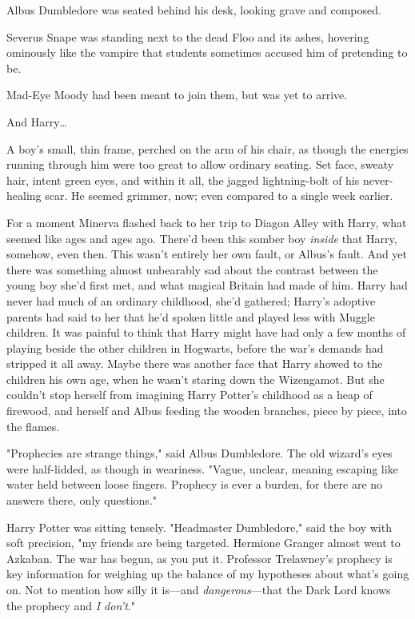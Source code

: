 Albus Dumbledore was seated behind his desk, looking grave and composed.

Severus Snape was standing next to the dead Floo and its ashes, hovering 
ominously like the vampire that students sometimes accused him of pretending to 
be.

Mad-Eye Moody had been meant to join them, but was yet to arrive.

And Harry{\ldots}

A boy's small, thin frame, perched on the arm of his chair, as though the 
energies running through him were too great to allow ordinary seating. Set 
face, sweaty hair, intent green eyes, and within it all, the jagged 
lightning-bolt of his never-healing scar. He seemed grimmer, now; even compared 
to a single week earlier.

For a moment Minerva flashed back to her trip to Diagon Alley with Harry, what 
seemed like ages and ages ago. There'd been this somber boy \emph{inside} that 
Harry, somehow, even then. This wasn't entirely her own fault, or Albus's 
fault. And yet there was something almost unbearably sad about the contrast 
between the young boy she'd first met, and what magical Britain had made of 
him. Harry had never had much of an ordinary childhood, she'd gathered; Harry's 
adoptive parents had said to her that he'd spoken little and played less with 
Muggle children. It was painful to think that Harry might have had only a few 
months of playing beside the other children in Hogwarts, before the war's 
demands had stripped it all away. Maybe there was another face that Harry 
showed to the children his own age, when he wasn't staring down the Wizengamot. 
But she couldn't stop herself from imagining Harry Potter's childhood as a heap 
of firewood, and herself and Albus feeding the wooden branches, piece by piece, 
into the flames.

"Prophecies are strange things," said Albus Dumbledore. The old wizard's eyes 
were half-lidded, as though in weariness. "Vague, unclear, meaning escaping 
like water held between loose fingers. Prophecy is ever a burden, for there are 
no answers there, only questions."

Harry Potter was sitting tensely. "Headmaster Dumbledore," said the boy with 
soft precision, "my friends are being targeted. Hermione Granger almost went to 
Azkaban. The war has begun, as you put it. Professor Trelawney's prophecy is 
key information for weighing up the balance of my hypotheses about what's going 
on. Not to mention how silly it is---and \emph{dangerous}---that the Dark Lord 
knows the prophecy and \emph{I don't}."

